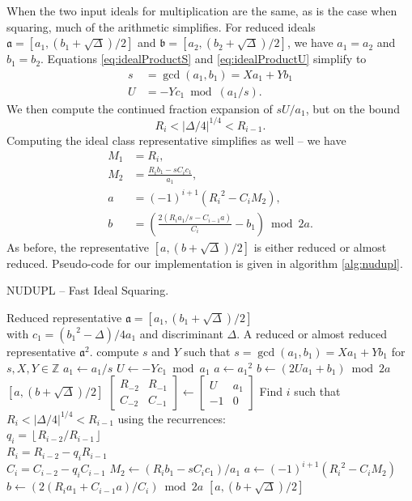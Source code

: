 \documentclass{ucalgthes1}
\theoremstyle{definition}
\newcommand{\ZZ}{\mathbb{Z}}
\newcommand{\matrixtt}[4]{\left[ \begin{array}{rr} #1 & #2 \\ #3 & #4 \end{array} \right]}
\newcommand{\floor}[1]{\left\lfloor #1 \right\rfloor}
\begin{document}
When the two input ideals for multiplication are the same, as is the case when squaring, much of the arithmetic simplifies.  For reduced ideals $\mathfrak a = [a_1, (b_1 + \sqrt\Delta)/2]$ and $\mathfrak b = [a_2, (b_2 + \sqrt\Delta)/2]$, we have $a_1=a_2$ and $b_1=b_2$.  Equations \ref{eq:idealProductS} and \ref{eq:idealProductU} simplify to
\begin{align*}
	s &= \gcd(a_1, b_1) = Xa_1 + Yb_1 \\
	U &= -Yc_1 \bmod (a_1/s).
\end{align*}
We then compute the continued fraction expansion of $sU/a_1$, but on the bound
\[
	R_i < |\Delta/4|^{1/4} < R_{i-1}.
\]
Computing the ideal class representative simplifies as well -- we have
\begin{align*}
	M_1 &= R_i, \\
	M_2 &= \frac{R_i b_1 - sC_i c_1}{a_1}, \\
	a &= (-1)^{i+1}({R_i}^2 - C_i M_2), \\
	b &= \left(\frac{2(R_i a_1/s  - C_{i-1} a)}{C_i} - b_1 \right) \bmod{2a}.
\end{align*}
As before, the representative $[a, (b+\sqrt\Delta)/2]$ is either reduced or almost reduced.  \break Pseudo-code for our implementation is given in algorithm \ref{alg:nudupl}.

\begin{algorithm}[h]
\caption{NUDUPL -- Fast Ideal Squaring.}
\label{alg:nudupl}
\begin{algorithmic}[1]
\REQUIRE Reduced representative $\mathfrak a = [a_1, (b_1+\sqrt\Delta)/2]$ \\
         with $c_1 = ({b_1}^2-\Delta)/4a_1$ and discriminant $\Delta$.
\ENSURE A reduced or almost reduced representative $\mathfrak a^2$.
\STATE compute $s$ and $Y$ such that $s = \gcd(a_1, b_1) = Xa_1 + Yb_1$ for $s,X,Y \in \ZZ$
\STATE $a_1 \gets a_1/s$
\STATE $U \gets -Yc_1 \bmod a_1$
	\STATE $a \gets {a_1}^2$
	\STATE $b \gets (2Ua_1 + b_1) \bmod 2a$
	\RETURN $[a, (b + \sqrt\Delta)/2]$
\ENDIF
\STATE $\matrixtt{R_{-2}}{R_{-1}}{C_{-2}}{C_{-1}} \gets \matrixtt{U}{a_1}{-1}{0}$
\STATE Find $i$ such that $R_i < |\Delta/4|^{1/4} < R_{i-1}$ using the recurrences: \\
       $q_i = \floor{R_{i-2}/R_{i-1}}$ \\
       $R_i = R_{i-2}-q_i R_{i-1}$ \\
       $C_i=C_{i-2}-q_i C_{i-1}$
\STATE $M_2 \gets (R_i b_1 -sC_i c_1)/a_1$
\STATE $a \gets (-1)^{i+1}({R_i}^2 - C_i M_2)$
\STATE $b \gets (2(R_i a_1 + C_{i-1} a)/C_i) \bmod{2a}$
\RETURN $[a, (b+\sqrt\Delta)/2]$
\end{algorithmic}
\end{algorithm}
\end{document}

